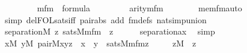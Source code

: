 \begin{isabellebody}
\ \ \ \ \isanewline
\ \ \ \ {\isachardoublequoteopen}mfm{\isacharparenleft}{\kern0pt}{}{\isacharparenright}{\kern0pt}\ {\isasymin}\ formula{\isachardoublequoteclose}\isanewline
\ \ \ \ \isanewline
\ \ \ \ {\isachardoublequoteopen}arity{\isacharparenleft}{\kern0pt}mfm{\isacharparenleft}{\kern0pt}{}{\isacharparenright}{\kern0pt}{\isacharparenright}{\kern0pt}\ {\isacharequal}{\kern0pt}\ {}{\isachardoublequoteclose}\isanewline
\ \ \ \ \isamarkupfalse%
\ mem{\isacharunderscore}{\kern0pt}fm{\isacharunderscore}{\kern0pt}auto\ \isamarkupfalse%
\ {\isacharparenleft}{\kern0pt}simp\ del{\isacharcolon}{\kern0pt}FOL{\isacharunderscore}{\kern0pt}sats{\isacharunderscore}{\kern0pt}iff\ pair{\isacharunderscore}{\kern0pt}abs\ add{\isacharcolon}{\kern0pt}\ fm{\isacharunderscore}{\kern0pt}defs\ nat{\isacharunderscore}{\kern0pt}simp{\isacharunderscore}{\kern0pt}union{\isacharparenright}{\kern0pt}\isanewline
\ \ \isamarkupfalse%
\isanewline
\ \ \isamarkupfalse%
\ {\isachardoublequoteopen}separation{\isacharparenleft}{\kern0pt}{\isacharhash}{\kern0pt}{\isacharhash}{\kern0pt}M{\isacharcomma}{\kern0pt}\ {\isasymlambda}z{\isachardot}{\kern0pt}\ sats{\isacharparenleft}{\kern0pt}M{\isacharcomma}{\kern0pt}mfm{\isacharparenleft}{\kern0pt}{}{\isacharparenright}{\kern0pt}\ {\isacharcomma}{\kern0pt}\ {\isacharbrackleft}{\kern0pt}z{\isacharbrackright}{\kern0pt}{\isacharparenright}{\kern0pt}{\isacharparenright}{\kern0pt}{\isachardoublequoteclose}\isanewline
\ \ \ \ \isamarkupfalse%
\ separation{\isacharunderscore}{\kern0pt}ax\ \isamarkupfalse%
\ simp\isanewline
\ \ \isamarkupfalse%
\isanewline
\ \ \isamarkupfalse%
\ {\isachardoublequoteopen}{\isacharparenleft}{\kern0pt}{\isasymexists}x{\isasymin}M{\isachardot}{\kern0pt}\ {\isasymexists}y{\isasymin}M{\isachardot}{\kern0pt}\ pair{\isacharparenleft}{\kern0pt}{\isacharhash}{\kern0pt}{\isacharhash}{\kern0pt}M{\isacharcomma}{\kern0pt}x{\isacharcomma}{\kern0pt}y{\isacharcomma}{\kern0pt}z{\isacharparenright}{\kern0pt}\ {\isacharampersand}{\kern0pt}\ x\ {\isasymin}\ y{\isacharparenright}{\kern0pt}\ {\isasymlongleftrightarrow}\ sats{\isacharparenleft}{\kern0pt}M{\isacharcomma}{\kern0pt}mfm{\isacharparenleft}{\kern0pt}{}{\isacharparenright}{\kern0pt}{\isacharcomma}{\kern0pt}{\isacharbrackleft}{\kern0pt}z{\isacharbrackright}{\kern0pt}{\isacharparenright}{\kern0pt}{\isachardoublequoteclose}\isanewline
\ \ \ \ \ {\isachardoublequoteopen}z{\isasymin}M{\isachardoublequoteclose}\ \ z\isanewline

\end{isabellebody}
